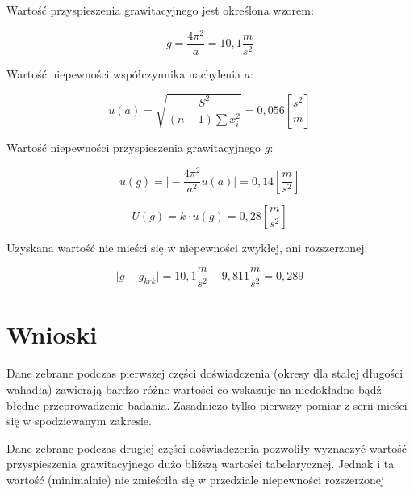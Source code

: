\documentclass[a4paper,10pt,twoside]{article}
\begin{document}
Wartość przyspieszenia grawitacyjnego jest określona wzorem:

$$ g = \frac{4 \pi^2}{a} = 10,1 \frac{m}{s^2} $$

Wartość niepewności współczynnika nachylenia $a$:

$$ u(a) = \sqrt{ \frac{S^2}{(n - 1)\sum x_i^2} } = 0,056 [\frac{s^2}{m}]$$

Wartość niepewności przyspieszenia grawitacyjnego $g$:

$$ u(g) = \vert - \frac{4 \pi^2}{a^2} u(a) \vert = 0,14 [\frac{m}{s^2}]$$

$$ U(g) = k \cdot u(g) = 0,28 [\frac{m}{s^2}]$$

Uzyskana wartość nie mieści się w niepewności zwykłej, ani rozszerzonej:

$$ \vert g - g_{krk} \vert = 10,1 \frac{m}{s^2} - 9,811 \frac{m}{s^2} = 0,289 $$

\section{Wnioski}

Dane zebrane podczas pierwszej części doświadczenia (okresy dla stałej długości wahadła) zawierają bardzo różne wartości co wskazuje na niedokładne bądź błędne przeprowadzenie badania. Zasadniczo tylko pierwszy pomiar z serii mieści się w spodziewanym zakresie.

Dane zebrane podczas drugiej części doświadczenia pozwoliły wyznaczyć wartość przyspieszenia grawitacyjnego dużo bliższą wartości tabelarycznej. Jednak i ta wartość (minimalnie) nie zmieściła się w przedziale niepewności rozszerzonej
\end{document}
